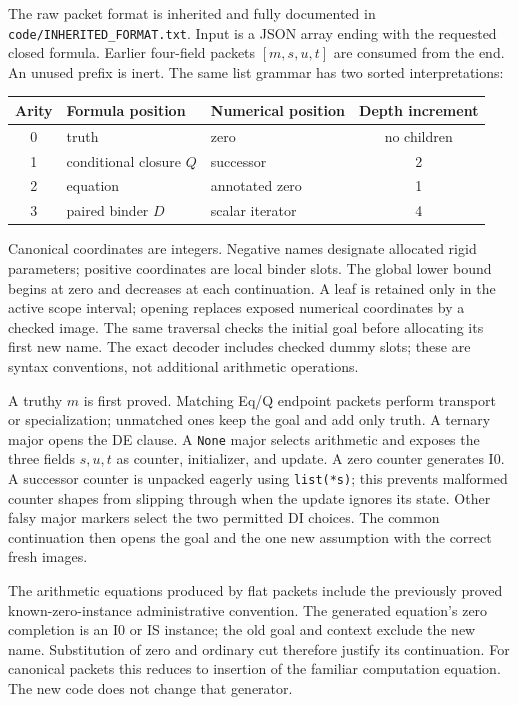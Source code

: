 \documentclass[11pt,letterpaper]{article}
\theoremstyle{definition}\newtheorem{definition}[theorem]{Definition}
\theoremstyle{remark}\newtheorem{remark}[theorem]{Remark}
\newcommand{\file}[1]{{\small\nolinkurl{#1}}}
\begin{document}
The raw packet format is inherited and fully documented in
\file{code/INHERITED_FORMAT.txt}. Input is a JSON array ending
with the requested closed formula. Earlier four-field packets
$[m,s,u,t]$ are consumed from the end. An unused prefix is inert.
The same list grammar has two sorted interpretations:
\begin{center}\small
\begin{tabular}{cllc}
\toprule
Arity & Formula position & Numerical position & Depth increment\\
\midrule
0 & truth & zero & no children\\
1 & conditional closure $Q$ & successor &2\\
2 & equation & annotated zero &1\\
3 & paired binder $D$ & scalar iterator &4\\
\bottomrule
\end{tabular}
\end{center}
Canonical coordinates are integers. Negative names designate
allocated rigid parameters; positive coordinates are local binder
slots. The global lower bound begins at zero and decreases at each
continuation. A leaf is retained only in the active scope interval;
opening replaces exposed numerical coordinates by a checked image.
The same traversal checks the initial goal before allocating its
first new name. The exact decoder includes checked dummy slots;
these are syntax conventions, not additional arithmetic operations.

A truthy $m$ is first proved. Matching Eq/Q endpoint packets perform
transport or specialization; unmatched ones keep the goal and add
only truth. A ternary major opens the DE clause. A \file{None}
major selects arithmetic and exposes the three fields $s,u,t$ as
counter, initializer, and update. A zero counter generates I0.
A successor counter is unpacked eagerly using \file{list(*s)};
this prevents malformed counter shapes from slipping through when
the update ignores its state. Other falsy major markers select the
two permitted DI choices. The common continuation then opens the
goal and the one new assumption with the correct fresh images.

The arithmetic equations produced by flat packets include the
previously proved known-zero-instance administrative convention.
The generated equation's zero completion is an I0 or IS instance;
the old goal and context exclude the new name. Substitution of zero
and ordinary cut therefore justify its continuation. For canonical
packets this reduces to insertion of the familiar computation
equation. The new code does not change that generator.
\end{document}
